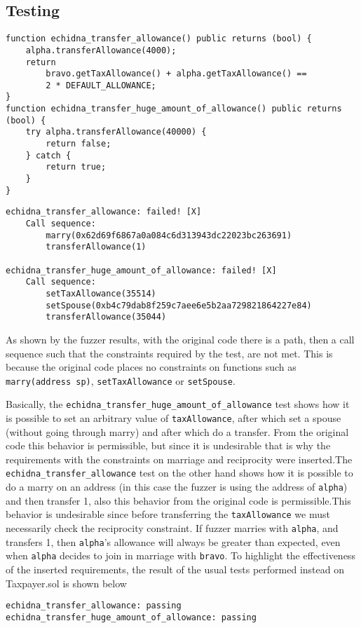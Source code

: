 \documentclass{article}
\begin{document}
\subsection{Testing}
\begin{verbatim}
function echidna_transfer_allowance() public returns (bool) {
    alpha.transferAllowance(4000);
    return
        bravo.getTaxAllowance() + alpha.getTaxAllowance() ==
        2 * DEFAULT_ALLOWANCE;
}
function echidna_transfer_huge_amount_of_allowance() public returns (bool) {
    try alpha.transferAllowance(40000) {
        return false;
    } catch {
        return true;
    }
}
\end{verbatim}

\begin{verbatim}
echidna_transfer_allowance: failed! [X]
    Call sequence:
        marry(0x62d69f6867a0a084c6d313943dc22023bc263691)
        transferAllowance(1)
    
echidna_transfer_huge_amount_of_allowance: failed! [X]
    Call sequence:
        setTaxAllowance(35514)
        setSpouse(0xb4c79dab8f259c7aee6e5b2aa729821864227e84)
        transferAllowance(35044)
\end{verbatim}
As shown by the fuzzer results, with the original code there is a path, then a call sequence such that the constraints required by the test, are not met. This is because the original code places no constraints on functions such as \texttt{marry(address sp)}, \texttt{setTaxAllowance} or \texttt{setSpouse}.

Basically, the \texttt{echidna\_transfer\_huge\_amount\_of\_allowance} test shows how it is possible to set an arbitrary value of \texttt{taxAllowance}, after which set a spouse (without going through marry) and after which do a transfer. From the original code this behavior is permissible, but since it is undesirable that is why the requirements with the constraints on marriage and reciprocity were inserted.The \texttt{echidna\_transfer\_allowance} test on the other hand shows how it is possible to do a marry on an address (in this case the fuzzer is using the address of \texttt{alpha}) and then transfer 1, also this behavior from the original code is permissible.This behavior is undesirable since before transferring the \texttt{taxAllowance} we must necessarily check the reciprocity constraint. If fuzzer marries with \texttt{alpha}, and transfers 1, then \texttt{alpha}'s allowance will always be greater than expected, even when \texttt{alpha} decides to join in marriage with \texttt{bravo}. 
To highlight the effectiveness of the inserted requirements, the result of the usual tests performed instead on Taxpayer.sol is shown below
\begin{verbatim}
echidna_transfer_allowance: passing
echidna_transfer_huge_amount_of_allowance: passing
\end{verbatim}
\end{document}
